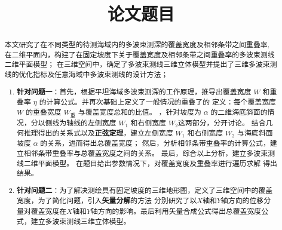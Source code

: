 \documentclass[withoutpreface,bwprint]{cumcmthesis} %
\title{论文题目}
\begin{document}
\begin{abstract}
    本文研究了在不同类型的待测海域内的多波束测深的覆盖宽度及相邻条带之间重叠率,
    在二维平面内，构建了在固定坡度下关于覆盖宽度及相邻条带之间重叠率的多波束测线二维平面模型；
    在三维空间中，确定了多波束测线三维立体模型并提出了三维多波束测线的优化指标及任意海域中多波束测线的设计方法；
    

    \begin{enumerate}
        \item \textbf{针对问题一}：首先，根据平坦海域多波束测深的工作原理，推导出覆盖宽度 $W$ 和重叠率 $\eta$ 的计算公式。并再次基础上定义了一般情况的重叠了的
        定义：每个覆盖宽度 $W$ 的重叠宽度 $W_\text{重}$ 与覆盖宽度总和的比值。
        ，针对坡度为 $\alpha$ 的二维海底斜面的情况，分以侧线为轴线的左侧宽度 $W_1$ 和右侧宽度 $W_2$这两部分，分开讨论。
        结合几何推理得出的关系式以及\textbf{正弦定理}，建立左侧宽度 $W_1$ 和右侧宽度 $W_2$ 与海底斜面坡度 $\alpha$ 的关系，进而得出总覆盖宽度；
        然后，分析相邻条带重叠率的计算公式，建立相邻条带重叠率与总覆盖宽度之间的关系。
        最后，综合以上分析，建立多波束测线二维平面模型。
        在题目给出参数情况下，对覆盖宽度及重叠率进行遍历求解
        得出结果。
        \item \textbf{针对问题二}：为了解决测绘具有固定坡度的三维地形图，定义了三维空间中的覆盖宽度，为了简化问题，引入\textbf{矢量分解}的方法
        分别研究了以$X$轴和$Y$轴方向的位移分量对覆盖宽度在$X$轴和$Y$轴方向的影响。最后利用矢量合成公式得出总覆盖宽度公式，建立多波束测线三维立体模型。
                

\end{enumerate}
\end{abstract}
\end{document}
